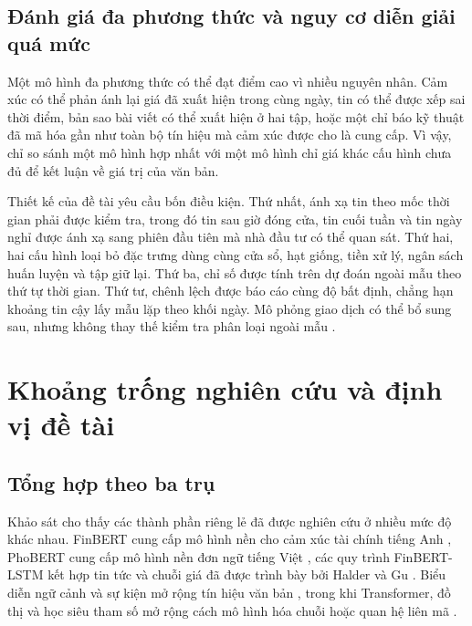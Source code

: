 \subsection{Đánh giá đa phương thức và nguy cơ diễn giải quá mức}

Một mô hình đa phương thức có thể đạt điểm cao vì nhiều nguyên nhân. Cảm xúc có thể
phản ánh lại giá đã xuất hiện trong cùng ngày, tin có thể được xếp sai thời điểm, bản
sao bài viết có thể xuất hiện ở hai tập, hoặc một chỉ báo kỹ thuật đã mã hóa gần như
toàn bộ tín hiệu mà cảm xúc được cho là cung cấp. Vì vậy, chỉ so sánh một mô hình
hợp nhất với một mô hình chỉ giá khác cấu hình chưa đủ để kết luận về giá trị của
văn bản.

Thiết kế của đề tài yêu cầu bốn điều kiện. Thứ nhất, ánh xạ tin theo mốc thời gian phải
được kiểm tra, trong đó tin sau giờ đóng cửa, tin cuối tuần và tin ngày nghỉ được ánh
xạ sang phiên đầu tiên mà nhà đầu tư có thể quan sát. Thứ hai, hai cấu hình loại bỏ đặc trưng
dùng cùng cửa sổ, hạt giống, tiền xử lý, ngân sách huấn luyện và tập giữ lại. Thứ ba, chỉ số
được tính trên dự đoán ngoài mẫu theo thứ tự thời gian. Thứ tư, chênh lệch được báo
cáo cùng độ bất định, chẳng hạn khoảng tin cậy lấy mẫu lặp theo khối ngày. Mô phỏng giao
dịch có thể bổ sung sau, nhưng không thay thế kiểm tra phân loại ngoài mẫu
\cite{Chen2021_210708721v1,Feng2018_181009936v2}.

\section{Khoảng trống nghiên cứu và định vị đề tài}
\label{sec:tq-gap}

\subsection{Tổng hợp theo ba trụ}

Khảo sát cho thấy các thành phần riêng lẻ đã được nghiên cứu ở nhiều mức độ khác nhau.
FinBERT cung cấp mô hình nền cho cảm xúc tài chính tiếng Anh
\cite{Yang2020_200608097v2}, PhoBERT cung cấp mô hình nền đơn ngữ tiếng Việt
\cite{Nguyen2020_200300744v3}, các quy trình FinBERT-LSTM kết hợp tin tức và chuỗi giá
đã được trình bày bởi Halder và Gu \cite{Halder2022_221107392v1,Gu2024_240716150v1}.
Biểu diễn ngữ cảnh và sự kiện mở rộng tín hiệu văn bản
\cite{Chen2021_210708721v1,Chen2019_191005078v1}, trong khi Transformer, đồ thị và
học siêu tham số mở rộng cách mô hình hóa chuỗi hoặc quan hệ liên mã
\cite{Omranpour2024_241210540v1,Boyle2023_230503835v1,
Xu2021_211013716v2,Zhao2023_230609862v3}.


